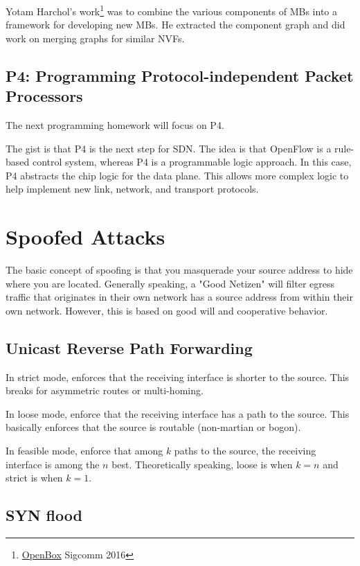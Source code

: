 \documentclass{idc_msc}
\begin{document}
Yotam Harchol's work\footnote{\href{www.openboxproject.org}{OpenBox} Sigcomm 2016} was to combine the various components of MBs into a framework for developing new MBs.
He extracted the component graph and did work on merging graphs for similar NVFs.

\subsection{P4: Programming Protocol-independent Packet Processors}

The next programming homework will focus on P4.

The gist is that P4 is the next step for SDN.
The idea is that OpenFlow is a rule-based control system, whereas P4 is a programmable logic approach.
In this case, P4 abstracts the chip logic for the data plane.
This allows more complex logic to help implement new link, network, and transport protocols.

\section{Spoofed Attacks}

The basic concept of spoofing is that you masquerade your source address to hide where you are located.
Generally speaking, a "Good Netizen" will filter egress traffic that originates in their own network has a source address from within their own network.
However, this is based on good will and cooperative behavior.

\subsection{Unicast Reverse Path Forwarding}

In strict mode, enforces that the receiving interface is shorter to the source.
This breaks for asymmetric routes or multi-homing.

In loose mode, enforce that the receiving interface has a path to the source.
This basically enforces that the source is routable (non-martian or bogon).

In feasible mode, enforce that among \(k\) paths to the source, the receiving interface is among the \(n\) best.
Theoretically speaking, loose is when \(k = n\) and strict is when \(k = 1\).

\subsection{SYN flood}
\end{document}
